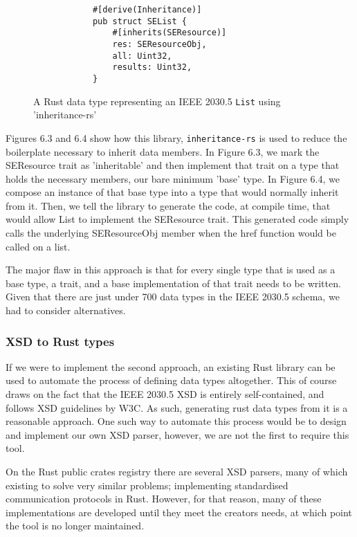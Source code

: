 \begin{figure}[H]
    \begin{center}
        \begin{lstlisting}
            #[derive(Inheritance)]
            pub struct SEList {
                #[inherits(SEResource)]
                res: SEResourceObj,
                all: Uint32,
                results: Uint32,
            }
        \end{lstlisting}
        \label{fig:listinher}
        \caption{A Rust data type representing an IEEE 2030.5 \texttt{List} using 'inheritance-rs'}
    \end{center}
\end{figure}


Figures 6.3 and 6.4 show how this library, \texttt{inheritance-rs} \cite[]{inheritancers} is used to reduce the boilerplate necessary to inherit data members. 
In Figure 6.3, we mark the SEResource trait as 'inheritable' and then implement that trait on a type that holds the necessary members, our bare minimum 'base' type. 
In Figure 6.4, we compose an instance of that base type into a type that would normally inherit from it. Then, we tell the library to generate the code, at compile time, that would allow List to implement the SEResource trait.
This generated code simply calls the underlying SEResourceObj member when the href function would be called on a list.

The major flaw in this approach is that for every single type that is used as a base type, a trait, and a base implementation of that trait needs to be written.
Given that there are just under 700 data types in the IEEE 2030.5 schema, we had to consider alternatives.


\subsubsection{XSD to Rust types}

If we were to implement the second approach, an existing Rust library can be used to automate the process of defining data types altogether.
This of course draws on the fact that the IEEE 2030.5 XSD is entirely self-contained, and follows XSD guidelines by W3C. As such, generating rust data types from it is a reasonable approach.
One such way to automate this process would be to design and implement our own XSD parser, however, we are not the first to require this tool. 

On the Rust public crates registry there are several XSD parsers, many of which existing to solve very similar problems; implementing standardised communication protocols in Rust.
However, for that reason, many of these implementations are developed until they meet the creators needs, at which point the tool is no longer maintained.

